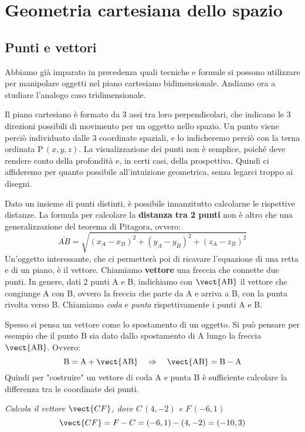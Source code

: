 \newcommand{\vettcol}[3]{\begin{pmatrix}
#1\\ #2\\ #3
\end{pmatrix}}


\chapter{Geometria cartesiana dello spazio}

\section{Punti e vettori}
\label{sec:Punti_e_vettori}

Abbiamo già imparato in precedenza quali tecniche e formule si possono utilizzare per manipolare oggetti nel piano cartesiano bidimensionale. Andiamo ora a studiare l'analogo caso tridimensionale. 

\vspace{7pt}

Il piano cartesiano è formato da 3 assi tra loro perpendicolari, che indicano le 3 direzioni possibili di movimento per un oggetto nello spazio. Un punto viene perciò individuato dalle 3 coordinate spaziali, e lo indicheremo perciò con la terna ordinata P\,$(x,y,z)$. La visualizzazione dei punti non è semplice, poiché deve rendere conto della profondità e, in certi casi, della prospettiva. Quindi ci affideremo per quanto possibile all'intuizione geometrica, senza legarci troppo ai disegni.

\vspace{7pt}

Dato un insieme di punti distinti, è possibile innanzitutto calcolarne le rispettive distanze. La formula per calcolare la \textbf{distanza tra 2 punti} non è altro che una generalizzazione del teorema di Pitagora, ovvero:
\[\overline{AB} = \sqrt{(x_A-x_B)^2+(y_A-y_B)^2+(z_A-z_B)^2}\]
Un'oggetto interessante, che ci permetterà poi di ricavare l'equazione di una retta e di un piano, è il vettore. Chiamiamo \textbf{vettore} una freccia che connette due punti. In genere, dati 2 punti A e B, indichiamo con $\vect{\text{AB}}$ il vettore che congiunge A con B, ovvero la freccia che parte da A e arriva a B, con la punta rivolta verso B. Chiamiamo \emph{coda} e \emph{punta} rispettivamente i punti A e B. 

\vspace{7pt}

Spesso si pensa un vettore come lo spostamento di un oggetto. Si può pensare per esempio che il punto B sia dato dallo spostamento di A lungo la freccia $\vect{\text{AB}}$. Ovvero:
\[\text{B} = \text{A}+\vect{\text{AB}} \quad \Rightarrow \quad \vect{\text{AB}} = \text{B}-\text{A}\]
Quindi per "costruire" un vettore di coda A e punta B è sufficiente calcolare la differenza tra le coordinate dei punti.
\begin{esempio}
\emph{Calcola il vettore $\vect{CF}$, dove $C\,(4,-2)$ e $F \, (-6,1)$}
\[\vect{CF} = F-C = (-6,1)-(4,-2) = (-10,3)\]
\end{esempio}

